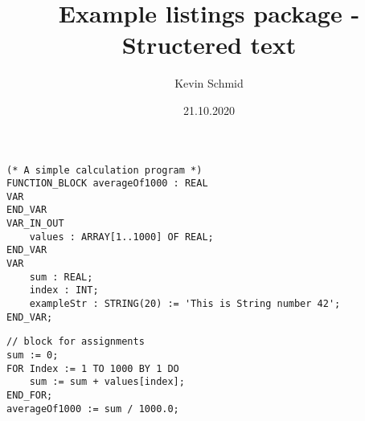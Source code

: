 \documentclass[12pt, a4paper, oneside]{scrreprt}
\title{Example listings package - Structered text}
\author{Kevin Schmid}
\date{21.10.2020}
\begin{document}
\begin{lstlisting}[language=ST, caption=function deklaration]
(* A simple calculation program *)
FUNCTION_BLOCK averageOf1000 : REAL
VAR
END_VAR
VAR_IN_OUT
	values : ARRAY[1..1000] OF REAL;
END_VAR
VAR
	sum : REAL;
	index : INT;
	exampleStr : STRING(20) := 'This is String number 42';
END_VAR;
\end{lstlisting}

\begin{lstlisting}[language=ST, caption=function block]
// block for assignments
sum := 0;
FOR Index := 1 TO 1000 BY 1 DO
	sum := sum + values[index];
END_FOR;
averageOf1000 := sum / 1000.0;
\end{lstlisting}
\end{document}
